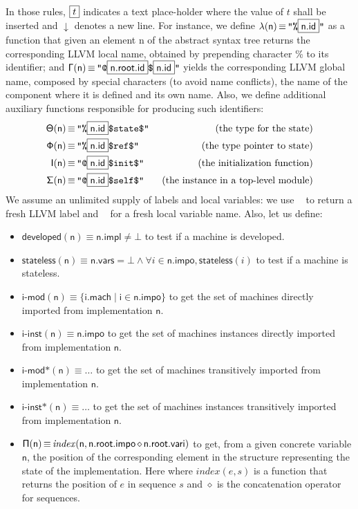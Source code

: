 \documentclass{llncs}
\newcommand{\nl}[0]{\ensuremath{\downarrow}}
\DeclareMathOperator{\conc}{\diamond}
\DeclareMathOperator{\isdef}{\equiv}
\DeclareMathOperator{\lbl}{\mathcal{L}()}
\DeclareMathOperator{\variable}{\mathcal{V}()}
\newcommand{\llvm}[1]{\texttt{#1}}
\newcommand{\B}[1]{\textsf{#1}}
\newcommand{\PH}[1]{\framebox{$#1$}}
\newcommand{\Global}[0]{\ensuremath{\sf\Gamma}}
\newcommand{\local}[0]{\ensuremath{\sf\lambda}}
\newcommand{\developed}[0]{\ensuremath{\textsf{developed}}}
\newcommand{\stateless}[0]{\ensuremath{\textsf{stateless}}}
\newcommand{\importedmodules}[0]{\ensuremath{\textsf{i-mod}}}
\newcommand{\trimportedmodules}[0]{\ensuremath{\textsf{i-mod$\mathsf{\ast}$}}}
\newcommand{\importedinstances}[0]{\ensuremath{\textsf{i-inst}}}
\newcommand{\trimportedinstances}[0]{\ensuremath{\textsf{i-inst$\mathsf{\ast}$}}}
\newcommand{\idx}[0]{\ensuremath{\sf\Pi}}
\newcommand{\state}[0]{\ensuremath{\sf\Theta}}
\newcommand{\stateref}[0]{\ensuremath{\sf\Phi}}
\newcommand{\self}[0]{\ensuremath{\sf\Sigma}}
\newcommand{\init}[0]{\ensuremath{\mathsf{I}}}
\begin{document}
In those rules, $\PH{t}$ indicates a text place-holder where the value of $t$
shall be inserted and $\nl$ denotes a new line. For instance, we define
$\local(\B{n}) \isdef \llvm{"\%\PH{\B{n.id}}"}$ as a function that given an
element \B{n} of the abstract syntax tree returns the corresponding LLVM local
name, obtained by prepending character \% to its identifier; and $\Global(\B{n})
\isdef \llvm{"@\PH{\B{n.root.id}}\$\PH{\B{n.id}}"}$ yields the corresponding
LLVM global name, composed by special characters (to avoid name conflicts), the
name of the component where it is defined and its own name.  Also, we define
additional auxiliary functions responsible for producing such identifiers:
\begin{align*}
\state(\B{n}) & \isdef \llvm{"\%\PH{\B{n.id}}\$state\$"} & \text{ (the type for the state)} \\
\stateref(\B{n}) & \isdef \llvm{"\%\PH{\B{n.id}}\$ref\$"} & \text{ (the type pointer to state)} \\
\init(\B{n}) & \isdef \llvm{"@\PH{\B{n.id}}\$init\$"} & \text{ (the initialization function)} \\
\self(\B{n}) & \isdef \llvm{"@\PH{\B{n.id}}\$self\$"} & \text{ (the instance in a top-level module)}
\end{align*}
We assume an unlimited supply of labels and local variables: we use $\lbl$ to
return a fresh LLVM label and $\variable$ for a fresh local variable name. Also, let us define:
\begin{itemize}
\item $\developed(\B{n}) \isdef \B{n.impl} \neq \bot$ to test if a machine is
  developed.
\item $\stateless(\B{n}) \isdef \B{n.vars} =  \bot \land \forall i \in \B{n.impo}, \stateless(i)$ to test if a machine is stateless.
\item $\importedmodules(\B{n}) \isdef \{ \B{i.mach} \mid \B{i} \in \B{n.impo}
  \}$ to get the set of machines directly imported from implementation $\B{n}$.
\item $\importedinstances(\B{n}) \isdef \B{n.impo}$ to get the set of machines
  instances directly imported from implementation $\B{n}$.
\item $\trimportedmodules(\B{n}) \isdef \ldots$ to get the set of machines
transitively imported from implementation $\B{n}$.
\item $\trimportedinstances(\B{n}) \isdef \ldots$ to get the set of machines
instances transitively imported from implementation $\B{n}$.
\item $\idx(\B{n}) \isdef \mathit{index}(\B{n}, \B{n.root.impo} \conc
  \B{n.root.vari})$ to get, from a given concrete variable $\B{n}$, the position
  of the corresponding element in the structure representing the state of the
  implementation. Here where $\mathit{index}(e, s)$ is a function that returns
  the position of $e$ in sequence $s$ and $\conc$ is the concatenation operator
  for sequences.
\end{itemize}
\end{document}
